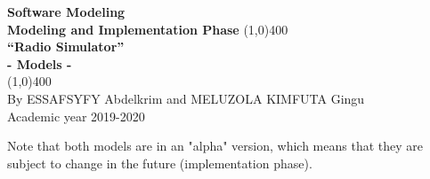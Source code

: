 \documentclass[11pt]{article}
\begin{document}
\begin{titlepage}
\begin{center}
\vspace*{1cm}
\Large{\textbf{Software Modeling}}\\
\Large{\textbf{Modeling and Implementation Phase}}
\vfill
\line(1,0){400}\\[1mm]
\huge{\textbf{“Radio Simulator”}}\\[3mm]
\Large{\textbf{- Models -}}\\[1mm]
\line(1,0){400}\\
\vfill
By ESSAFSYFY Abdelkrim and MELUZOLA KIMFUTA Gingu\\
Academic year 2019-2020

\end{center}
\end{titlepage}

\tableofcontents
\thispagestyle{empty} %
\clearpage %
\setcounter{page}{1} %

Note that both models are in an "alpha" version, which means that they are subject to change in the future (implementation phase).
\end{document}

